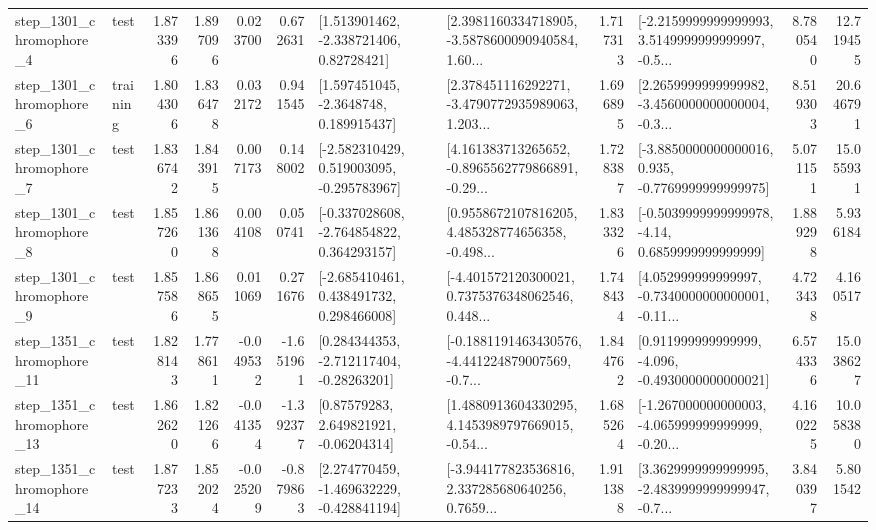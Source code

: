 \begin{tabular}{llrrrrllrlrr}
  step\_1301\_chromophore\_4 &      test &      1.873396 &    1.897096 &      0.023700 &  0.672631 &     [1.513901462, -2.338721406, 0.82728421] &  [2.3981160334718905, -3.5878600090940584, 1.60... &       1.717313 &  [-2.2159999999999993, 3.5149999999999997, -0.5... &            8.780540 &         12.719455 \\
  step\_1301\_chromophore\_6 &  training &      1.804306 &    1.836478 &      0.032172 &  0.941545 &      [1.597451045, -2.3648748, 0.189915437] &  [2.378451116292271, -3.4790772935989063, 1.203... &       1.696895 &  [2.2659999999999982, -3.4560000000000004, -0.3... &            8.519303 &         20.646791 \\
  step\_1301\_chromophore\_7 &      test &      1.836742 &    1.843915 &      0.007173 &  0.148002 &   [-2.582310429, 0.519003095, -0.295783967] &  [4.161383713265652, -0.8965562779866891, -0.29... &       1.728387 &  [-3.8850000000000016, 0.935, -0.7769999999999975] &            5.071151 &         15.055931 \\
  step\_1301\_chromophore\_8 &      test &      1.857260 &    1.861368 &      0.004108 &  0.050741 &   [-0.337028608, -2.764854822, 0.364293157] &  [0.9558672107816205, 4.485328774656358, -0.498... &       1.833326 &   [-0.5039999999999978, -4.14, 0.6859999999999999] &            1.889298 &          5.936184 \\
  step\_1301\_chromophore\_9 &      test &      1.857586 &    1.868655 &      0.011069 &  0.271676 &    [-2.685410461, 0.438491732, 0.298466008] &  [-4.401572120300021, 0.7375376348062546, 0.448... &       1.748434 &  [4.052999999999997, -0.7340000000000001, -0.11... &            4.723438 &          4.160517 \\
 step\_1351\_chromophore\_11 &      test &      1.828143 &    1.778611 &     -0.049532 & -1.651961 &    [0.284344353, -2.712117404, -0.28263201] &  [-0.1881191463430576, -4.441224879007569, -0.7... &       1.844762 &   [0.911999999999999, -4.096, -0.4930000000000021] &            6.574336 &         15.038627 \\
 step\_1351\_chromophore\_13 &      test &      1.862620 &    1.821266 &     -0.041354 & -1.392377 &      [0.87579283, 2.649821921, -0.06204314] &  [1.4880913604330295, 4.1453989797669015, -0.54... &       1.685264 &  [-1.267000000000003, -4.065999999999999, -0.20... &            4.160225 &         10.058380 \\
 step\_1351\_chromophore\_14 &      test &      1.877233 &    1.852024 &     -0.025209 & -0.879863 &   [2.274770459, -1.469632229, -0.428841194] &  [-3.944177823536816, 2.337285680640256, 0.7659... &       1.911388 &  [3.3629999999999995, -2.4839999999999947, -0.7... &            3.840397 &          5.801542 \\

\end{tabular}
